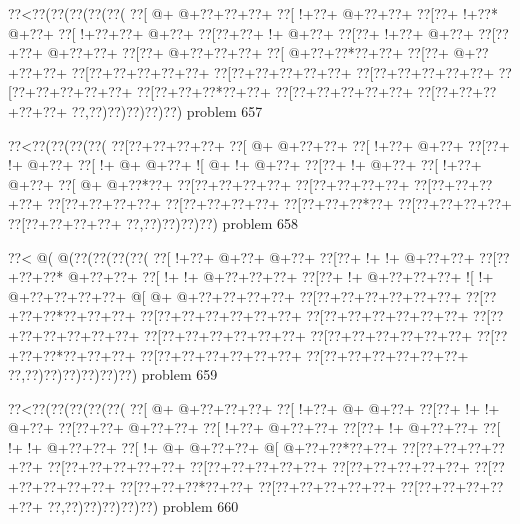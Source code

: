 \vbox{\vbox{\goo
\0??<\0??(\0??(\0??(\0??(\0??(
\0??[\- @+\- @+\0??+\0??+\0??+
\0??[\- !+\0??+\- @+\0??+\0??+
\0??[\0??+\- !+\0??*\- @+\0??+
\0??[\- !+\0??+\0??+\- @+\0??+
\0??[\0??+\0??+\- !+\- @+\0??+
\0??[\0??+\- !+\0??+\- @+\0??+
\0??[\0??+\0??+\- @+\0??+\0??+
\0??[\0??+\- @+\0??+\0??+\0??+
\0??[\- @+\0??+\0??*\0??+\0??+
\0??[\0??+\- @+\0??+\0??+\0??+
\0??[\0??+\0??+\0??+\0??+\0??+
\0??[\0??+\0??+\0??+\0??+\0??+
\0??[\0??+\0??+\0??+\0??+\0??+
\0??[\0??+\0??+\0??+\0??+\0??+
\0??[\0??+\0??+\0??*\0??+\0??+
\0??[\0??+\0??+\0??+\0??+\0??+
\0??[\0??+\0??+\0??+\0??+\0??+
\0??,\0??)\0??)\0??)\0??)\0??)
}
\hfil problem 657\hfil\break
}

\vbox{\vbox{\goo
\0??<\0??(\0??(\0??(\0??(
\0??[\0??+\0??+\0??+\0??+
\0??[\- @+\- @+\0??+\0??+
\0??[\- !+\0??+\- @+\0??+
\0??[\0??+\- !+\- @+\0??+
\0??[\- !+\- @+\- @+\0??+
\- ![\- @+\- !+\- @+\0??+
\0??[\0??+\- !+\- @+\0??+
\0??[\- !+\0??+\- @+\0??+
\0??[\- @+\- @+\0??*\0??+
\0??[\0??+\0??+\0??+\0??+
\0??[\0??+\0??+\0??+\0??+
\0??[\0??+\0??+\0??+\0??+
\0??[\0??+\0??+\0??+\0??+
\0??[\0??+\0??+\0??+\0??+
\0??[\0??+\0??+\0??*\0??+
\0??[\0??+\0??+\0??+\0??+
\0??[\0??+\0??+\0??+\0??+
\0??,\0??)\0??)\0??)\0??)
}
\hfil problem 658\hfil\break
}

\vbox{\vbox{\goo
\0??<\- @(\- @(\0??(\0??(\0??(\0??(
\0??[\- !+\0??+\- @+\0??+\- @+\0??+
\0??[\0??+\- !+\- !+\- @+\0??+\0??+
\0??[\0??+\0??+\0??*\- @+\0??+\0??+
\0??[\- !+\- !+\- @+\0??+\0??+\0??+
\0??[\0??+\- !+\- @+\0??+\0??+\0??+
\- ![\- !+\- @+\0??+\0??+\0??+\0??+
\- @[\- @+\- @+\0??+\0??+\0??+\0??+
\0??[\0??+\0??+\0??+\0??+\0??+\0??+
\0??[\0??+\0??+\0??*\0??+\0??+\0??+
\0??[\0??+\0??+\0??+\0??+\0??+\0??+
\0??[\0??+\0??+\0??+\0??+\0??+\0??+
\0??[\0??+\0??+\0??+\0??+\0??+\0??+
\0??[\0??+\0??+\0??+\0??+\0??+\0??+
\0??[\0??+\0??+\0??+\0??+\0??+\0??+
\0??[\0??+\0??+\0??*\0??+\0??+\0??+
\0??[\0??+\0??+\0??+\0??+\0??+\0??+
\0??[\0??+\0??+\0??+\0??+\0??+\0??+
\0??,\0??)\0??)\0??)\0??)\0??)\0??)
}
\hfil problem 659\hfil\break
}

\vbox{\vbox{\goo
\0??<\0??(\0??(\0??(\0??(\0??(
\0??[\- @+\- @+\0??+\0??+\0??+
\0??[\- !+\0??+\- @+\- @+\0??+
\0??[\0??+\- !+\- !+\- @+\0??+
\0??[\0??+\0??+\- @+\0??+\0??+
\0??[\- !+\0??+\- @+\0??+\0??+
\0??[\0??+\- !+\- @+\0??+\0??+
\0??[\- !+\- !+\- @+\0??+\0??+
\0??[\- !+\- @+\- @+\0??+\0??+
\- @[\- @+\0??+\0??*\0??+\0??+
\0??[\0??+\0??+\0??+\0??+\0??+
\0??[\0??+\0??+\0??+\0??+\0??+
\0??[\0??+\0??+\0??+\0??+\0??+
\0??[\0??+\0??+\0??+\0??+\0??+
\0??[\0??+\0??+\0??+\0??+\0??+
\0??[\0??+\0??+\0??*\0??+\0??+
\0??[\0??+\0??+\0??+\0??+\0??+
\0??[\0??+\0??+\0??+\0??+\0??+
\0??,\0??)\0??)\0??)\0??)\0??)
}
\hfil problem 660\hfil\break
}

